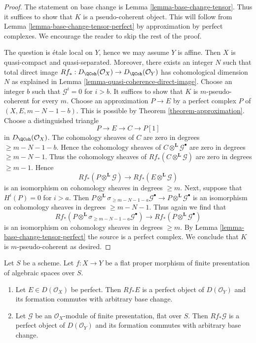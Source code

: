 \begin{proof}
The statement on base change is Lemma \ref{lemma-base-change-tensor}.
Thus it suffices to show that $K$ is a pseudo-coherent object.
This will follow from Lemma \ref{lemma-base-change-tensor-perfect}
by approximation by perfect complexes. We encourage the reader to
skip the rest of the proof.

\medskip\noindent
The question is \'etale local on $Y$, hence we may assume $Y$ is affine.
Then $X$ is quasi-compact and quasi-separated. Moreover, there
exists an integer $N$ such that total direct image
$Rf_* : D_\QCoh(\mathcal{O}_X) \to D_\QCoh(\mathcal{O}_Y)$
has cohomological dimension $N$ as explained in
Lemma \ref{lemma-quasi-coherence-direct-image}.
Choose an integer $b$ such that $\mathcal{G}^i = 0$ for $i > b$.
It suffices to show that $K$ is $m$-pseudo-coherent for
every $m$. Choose an approximation $P \to E$ by a perfect complex $P$
of $(X, E, m - N - 1 - b)$. This is possible by
Theorem \ref{theorem-approximation}.
Choose a distinguished triangle
$$
P \to E \to C \to P[1]
$$
in $D_\QCoh(\mathcal{O}_X)$. The cohomology sheaves of $C$ are zero
in degrees $\geq m - N - 1 - b$. Hence
the cohomology sheaves of $C \otimes^\mathbf{L} \mathcal{G}^\bullet$
are zero in degrees $\geq m - N - 1$.
Thus the cohomology sheaves of $Rf_*(C \otimes^\mathbf{L} \mathcal{G})$
are zero in degrees $\geq m - 1$. Hence
$$
Rf_*(P \otimes^\mathbf{L} \mathcal{G}) \to
Rf_*(E \otimes^\mathbf{L} \mathcal{G})
$$
is an isomorphism on cohomology sheaves in degrees $\geq m$.
Next, suppose that $H^i(P) = 0$ for $i > a$. Then
$
P \otimes^\mathbf{L} \sigma_{\geq m - N - 1 - a}\mathcal{G}^\bullet
\longrightarrow
P \otimes^\mathbf{L} \mathcal{G}^\bullet
$
is an isomorphism on cohomology sheaves in degrees $\geq m - N - 1$.
Thus again we find that
$$
Rf_*(P \otimes^\mathbf{L} \sigma_{\geq m - N - 1 - a}\mathcal{G}^\bullet) \to
Rf_*(P \otimes^\mathbf{L} \mathcal{G}^\bullet)
$$
is an isomorphism on cohomology sheaves in degrees $\geq m$.
By Lemma \ref{lemma-base-change-tensor-perfect} the source
is a perfect complex.
We conclude that $K$ is $m$-pseudo-coherent as desired.
\end{proof}

\begin{lemma}
\label{lemma-flat-proper-perfect-direct-image-general}
Let $S$ be a scheme. Let $f : X \to Y$ be a flat proper
morphism of finite presentation of algebraic spaces over $S$.
\begin{enumerate}
\item Let $E \in D(\mathcal{O}_X)$ be perfect. Then
$Rf_*E$ is a perfect object of $D(\mathcal{O}_Y)$ and its formation
commutes with arbitrary base change.
\item Let $\mathcal{G}$ be an $\mathcal{O}_X$-module of finite presentation,
flat over $S$. Then $Rf_*\mathcal{G}$ is a perfect object of
$D(\mathcal{O}_Y)$ and its formation commutes with arbitrary base change.
\end{enumerate}
\end{lemma}

